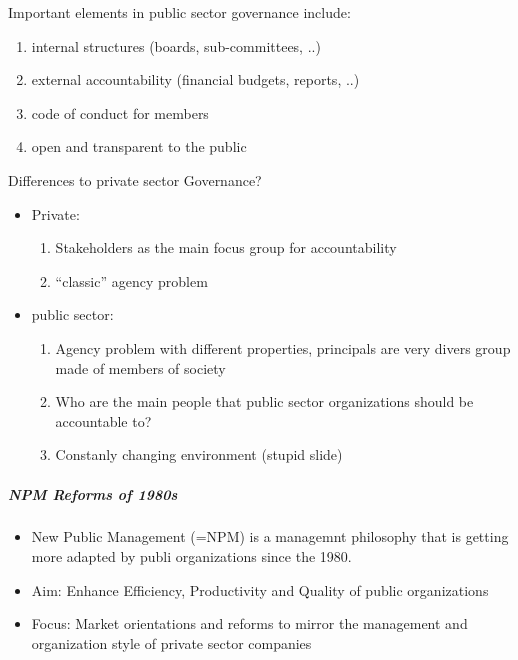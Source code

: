 \documentclass[
]{article}
\providecommand{\tightlist}{%
  \setlength{\itemsep}{0pt}\setlength{\parskip}{0pt}}
\begin{document}
Important elements in public sector governance include:

\begin{enumerate}
\def\labelenumi{\arabic{enumi}.}
\tightlist
\item
  internal structures (boards, sub-committees, ..)
\item
  external accountability (financial budgets, reports, ..)
\item
  code of conduct for members
\item
  open and transparent to the public
\end{enumerate}

Differences to private sector Governance?

\begin{itemize}
\tightlist
\item
  Private:

  \begin{enumerate}
  \def\labelenumi{\arabic{enumi}.}
  \tightlist
  \item
    Stakeholders as the main focus group for accountability
  \item
    ``classic'' agency problem
  \end{enumerate}
\item
  public sector:

  \begin{enumerate}
  \def\labelenumi{\arabic{enumi}.}
  \tightlist
  \item
    Agency problem with different properties, principals are very divers
    group made of members of society
  \item
    Who are the main people that public sector organizations should be
    accountable to?
  \item
    Constanly changing environment (stupid slide)
  \end{enumerate}
\end{itemize}

\hypertarget{npm-reforms-of-1980s}{%
\subparagraph{NPM Reforms of 1980s}\label{npm-reforms-of-1980s}}

\begin{itemize}
\tightlist
\item
  New Public Management (=NPM) is a managemnt philosophy that is getting
  more adapted by publi organizations since the 1980.
\item
  Aim: Enhance Efficiency, Productivity and Quality of public
  organizations
\item
  Focus: Market orientations and reforms to mirror the management and
  organization style of private sector companies
\end{itemize}
\end{document}

